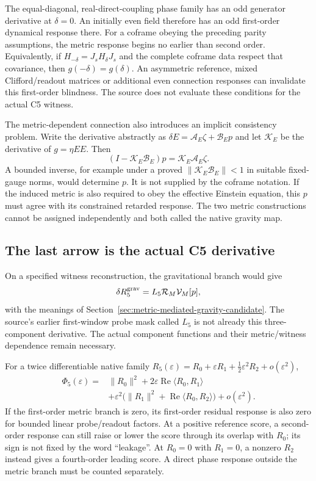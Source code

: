 \documentclass[11pt,a4paper]{article}
\begin{document}
The equal-diagonal, real-direct-coupling phase family has an odd
generator derivative at $\delta=0$. An initially even field
therefore has an odd first-order dynamical response there.
For a coframe obeying the preceding parity assumptions, the
metric response begins no earlier than second order. Equivalently,
if $H_{-\delta}=J_sH_\delta J_s$ and the complete coframe data
respect that covariance, then $g(-\delta)=g(\delta)$.
An asymmetric reference, mixed Clifford/readout matrices or
additional even connection responses can invalidate this
first-order blindness. The source does not evaluate these
conditions for the actual C5 witness.

The metric-dependent connection also introduces an implicit
consistency problem. Write the derivative abstractly as
$\delta E=\mathcal A_E\zeta+\mathcal B_Ep$ and let
$\mathcal K_E$ be the derivative of $g=\eta EE$. Then
\[
 (I-\mathcal K_E\mathcal B_E)p
 =\mathcal K_E\mathcal A_E\zeta.
\]
A bounded inverse, for example under a proved
$\|\mathcal K_E\mathcal B_E\|<1$ in suitable fixed-gauge norms,
would determine $p$. It is not supplied by the coframe notation.
If the induced metric is also required to obey the effective
Einstein equation, this $p$ must agree with its constrained
retarded response. The two metric constructions cannot be
assigned independently and both called the native gravity map.

\subsection{The last arrow is the actual C5 derivative}
On a specified witness reconstruction, the gravitational branch
would give
\[
 \delta R_5^{\rm grav}
 =L_5\mathcal R_M\mathcal V_M[p],
\]
with the meanings of Section~\ref{sec:metric-mediated-gravity-candidate}.
The source's earlier first-window probe mask called $L_5$ is not
already this three-component derivative. The actual component
functions and their metric/witness dependence remain necessary.

For a twice differentiable native family
$R_5(\varepsilon)=R_0+\varepsilon R_1+
\tfrac12\varepsilon^2R_2+o(\varepsilon^2)$,
\[
 \begin{aligned}
 \Phi_5(\varepsilon)={}&\|R_0\|^2
 +2\varepsilon\operatorname{Re}\langle R_0,R_1\rangle\\
 &+\varepsilon^2\bigl(\|R_1\|^2
 +\operatorname{Re}\langle R_0,R_2\rangle\bigr)
 +o(\varepsilon^2).
 \end{aligned}
\]
If the first-order metric branch is zero, its first-order residual
response is also zero for bounded linear probe/readout factors.
At a positive reference score, a second-order response can still
raise or lower the score through its overlap with $R_0$; its sign
is not fixed by the word ``leakage''. At $R_0=0$ with $R_1=0$,
a nonzero $R_2$ instead gives a fourth-order leading score. A direct phase
response outside the metric branch must be counted separately.
\end{document}

